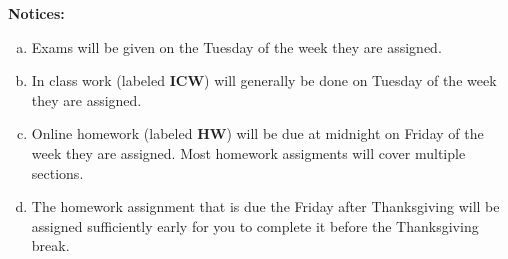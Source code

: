 \documentclass[12pt]{article}
\newcounter{ex}\setcounter{ex}{0}
\newenvironment{alphalist}{
  \begin{enumerate}[(a)]
    \addtolength{\itemsep}{-0.5\itemsep}}
  {\end{enumerate}}
\begin{document}
\vspace{0.1in}
\noindent \textbf{Notices:}


\begin{alphalist}
   \item Exams will be given on the Tuesday of the week they are assigned.
   
   \item In class work (labeled \textbf{ICW}) will generally be 
    done on Tuesday of the week they are assigned.

    \item Online homework (labeled \textbf{HW}) will be due at midnight on
          Friday of the week they are assigned. Most homework assigments will
          cover multiple sections. 

    \item The homework assignment that is due the Friday after Thanksgiving
          will be assigned sufficiently early for you to complete it before
          the Thanksgiving break.
\end{alphalist}

\vspace{0.1in}
\end{document}
